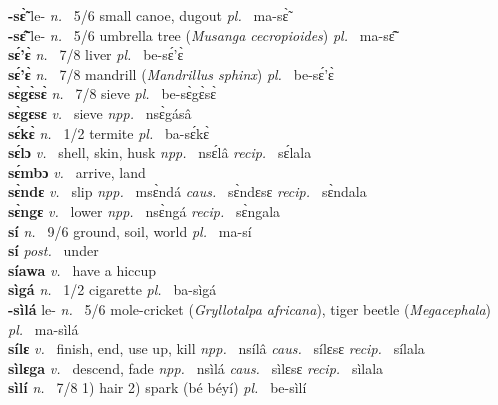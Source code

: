 {\bfseries -sɛ̃̀} le- {\itshape n.~} 5/6 small canoe, dugout {\itshape pl.~} ma-sɛ̃̀    \\ 
{\bfseries -sɛ̃̂} le- {\itshape n.~} 5/6 umbrella tree ({\itshape Musanga cecropioides}) {\itshape pl.~} ma-sɛ̃̂    \\ 
{\bfseries sɛ́'ɛ̀}  {\itshape n.~} 7/8 liver {\itshape pl.~} be-sɛ́'ɛ̀    \\ 
{\bfseries sɛ́'ɛ̀}  {\itshape n.~} 7/8 mandrill ({\itshape Mandrillus sphinx}) {\itshape pl.~} be-sɛ́'ɛ̀    \\ 
{\bfseries sɛ̀gɛ̀sɛ̀}  {\itshape n.~} 7/8 sieve {\itshape pl.~} be-sɛ̀gɛ̀sɛ̀    \\ 
{\bfseries sɛ̀gɛsɛ}  {\itshape v.~} sieve   {\itshape npp.~} nsɛ̀gásâ  \\ 
{\bfseries sɛ́kɛ̀}  {\itshape n.~} 1/2 termite {\itshape pl.~} ba-sɛ́kɛ̀    \\ 
{\bfseries sɛ́lɔ}  {\itshape v.~} shell, skin, husk   {\itshape npp.~} nsɛ́lâ {\itshape recip.~} sɛ́lala  \\ 
{\bfseries sɛ́mbɔ}  {\itshape v.~} arrive, land    \\ 
{\bfseries sɛ̀ndɛ}  {\itshape v.~} slip   {\itshape npp.~} msɛ̀ndá {\itshape caus.~} sɛ̀ndɛsɛ {\itshape recip.~} sɛ̀ndala  \\ 
{\bfseries sɛ̀ngɛ}  {\itshape v.~} lower   {\itshape npp.~} nsɛ̀ngá {\itshape recip.~} sɛ̀ngala  \\ 
{\bfseries sí}  {\itshape n.~} 9/6 ground, soil, world {\itshape pl.~} ma-sí    \\ 
{\bfseries sí}  {\itshape post.~} under    \\ 
{\bfseries síawa}  {\itshape v.~} have a hiccup    \\ 
{\bfseries sìgá}  {\itshape n.~} 1/2 cigarette {\itshape pl.~} ba-sìgá    \\ 
{\bfseries -sìlá} le- {\itshape n.~} 5/6 mole-cricket ({\itshape Gryllotalpa africana}), tiger beetle ({\itshape Megacephala}) {\itshape pl.~} ma-sìlá    \\ 
{\bfseries sílɛ}  {\itshape v.~} finish, end, use up, kill   {\itshape npp.~} nsílâ {\itshape caus.~} sílɛsɛ  {\itshape recip.~} sílala  \\ 
{\bfseries sìlɛga}  {\itshape v.~} descend, fade   {\itshape npp.~} nsìlá {\itshape caus.~} sìlɛsɛ {\itshape recip.~} sìlala  \\ 
{\bfseries sìlí}  {\itshape n.~} 7/8 1) hair 2) spark (bé béyí) {\itshape pl.~} be-sìlí    \\ 
